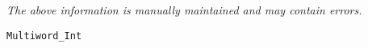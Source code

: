 \label{pkg:multiword\_int}

{\tiny \it The above information is manually maintained and may contain errors.}
\begin{verbatim}
Multiword_Int
\end{verbatim}
